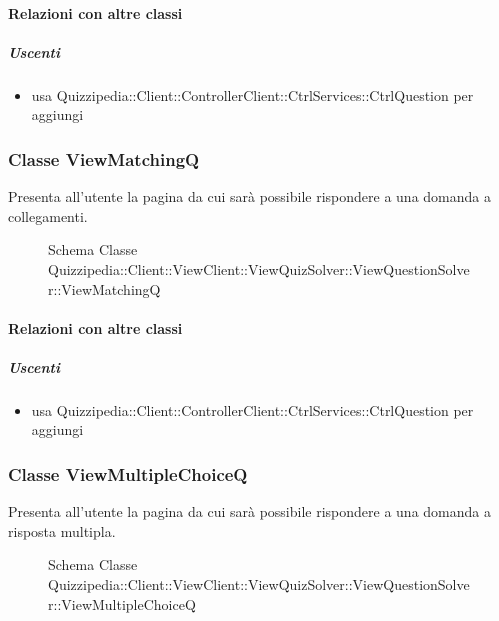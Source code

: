 \paragraph{Relazioni con altre classi}
\subparagraph{Uscenti}
\begin{itemize}
\item usa Quizzipedia::Client::ControllerClient::CtrlServices::CtrlQuestion per aggiungi
\end{itemize}
\subsubsection{Classe ViewMatchingQ}
Presenta all'utente la pagina da cui sarà possibile rispondere a una domanda a collegamenti.
\begin{figure}[H]
\centering
\noindent{}
\caption[Schema Classe ViewMatchingQ]{Schema Classe Quizzipedia::Client::ViewClient::ViewQuizSolver::ViewQuestionSolver::ViewMatchingQ}
\end{figure}
\paragraph{Relazioni con altre classi}
\subparagraph{Uscenti}
\begin{itemize}
\item usa Quizzipedia::Client::ControllerClient::CtrlServices::CtrlQuestion per aggiungi
\end{itemize}
\subsubsection{Classe ViewMultipleChoiceQ}
Presenta all'utente la pagina da cui sarà possibile rispondere a una domanda a risposta multipla.
\begin{figure}[H]
\centering
\noindent{}
\caption[Schema Classe ViewMultipleChoiceQ]{Schema Classe Quizzipedia::Client::ViewClient::ViewQuizSolver::ViewQuestionSolver::ViewMultipleChoiceQ}
\end{figure}
